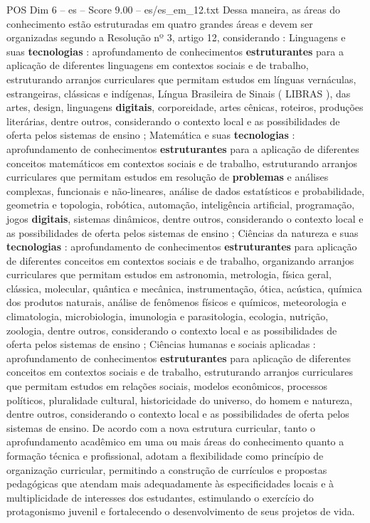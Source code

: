 \begin{textsample}{POS Dim 6 – es – Score 9.00 – es/es\_em\_12.txt}
Dessa maneira, as áreas do conhecimento estão estruturadas em quatro grandes áreas e devem ser organizadas segundo a Resolução nº 3, artigo 12, considerando : Linguagens e suas \textbf{tecnologias} : aprofundamento de conhecimentos \textbf{estruturantes} para a aplicação de diferentes linguagens em contextos sociais e de trabalho, estruturando arranjos curriculares que permitam estudos em línguas vernáculas, estrangeiras, clássicas e indígenas, Língua Brasileira de Sinais ( LIBRAS ), das artes, design, linguagens \textbf{digitais}, corporeidade, artes cênicas, roteiros, produções literárias, dentre outros, considerando o contexto local e as possibilidades de oferta pelos sistemas de ensino ; Matemática e suas \textbf{tecnologias} : aprofundamento de conhecimentos \textbf{estruturantes} para a aplicação de diferentes conceitos matemáticos em contextos sociais e de trabalho, estruturando arranjos curriculares que permitam estudos em resolução de \textbf{problemas} e análises complexas, funcionais e não-lineares, análise de dados estatísticos e probabilidade, geometria e topologia, robótica, automação, inteligência artificial, programação, jogos \textbf{digitais}, sistemas dinâmicos, dentre outros, considerando o contexto local e as possibilidades de oferta pelos sistemas de ensino ; Ciências da natureza e suas \textbf{tecnologias} : aprofundamento de conhecimentos \textbf{estruturantes} para aplicação de diferentes conceitos em contextos sociais e de trabalho, organizando arranjos curriculares que permitam estudos em astronomia, metrologia, física geral, clássica, molecular, quântica e mecânica, instrumentação, ótica, acústica, química dos produtos naturais, análise de fenômenos físicos e químicos, meteorologia e climatologia, microbiologia, imunologia e parasitologia, ecologia, nutrição, zoologia, dentre outros, considerando o contexto local e as possibilidades de oferta pelos sistemas de ensino ; Ciências humanas e sociais aplicadas : aprofundamento de conhecimentos \textbf{estruturantes} para aplicação de diferentes conceitos em contextos sociais e de trabalho, estruturando arranjos curriculares que permitam estudos em relações sociais, modelos econômicos, processos políticos, pluralidade cultural, historicidade do universo, do homem e natureza, dentre outros, considerando o contexto local e as possibilidades de oferta pelos sistemas de ensino.
De acordo com a nova estrutura curricular, tanto o aprofundamento acadêmico em uma ou mais áreas do conhecimento quanto a formação técnica e profissional, adotam a flexibilidade como princípio de organização curricular, permitindo a construção de currículos e propostas pedagógicas que atendam mais adequadamente às especificidades locais e à multiplicidade de interesses dos estudantes, estimulando o exercício do protagonismo juvenil e fortalecendo o desenvolvimento de seus projetos de vida.

\end{textsample}
